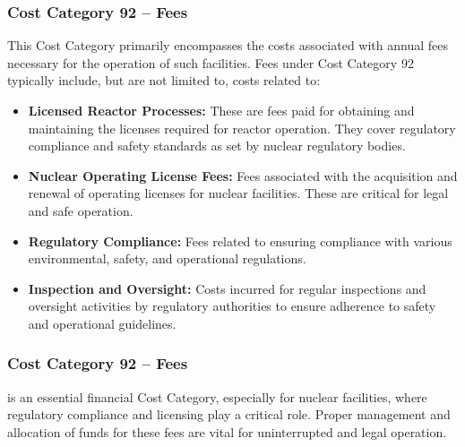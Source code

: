 \subsubsection*{Cost Category 92 – Fees}
This Cost Category primarily encompasses the costs associated with annual fees necessary for the operation of such facilities.  Fees under Cost Category 92 typically include, but are not limited to, costs related to:

\begin{itemize}
    \item \textbf{Licensed Reactor Processes:} These are fees paid for obtaining and maintaining the licenses required for reactor operation. They cover regulatory compliance and safety standards as set by nuclear regulatory bodies.
    \item \textbf{Nuclear Operating License Fees:} Fees associated with the acquisition and renewal of operating licenses for nuclear facilities. These are critical for legal and safe operation.
    \item \textbf{Regulatory Compliance:} Fees related to ensuring compliance with various environmental, safety, and operational regulations.
    \item \textbf{Inspection and Oversight:} Costs incurred for regular inspections and oversight activities by regulatory authorities to ensure adherence to safety and operational guidelines.
\end{itemize}

\subsubsection{Cost Category 92 – Fees} is an essential financial Cost Category, especially for nuclear facilities, where regulatory compliance and licensing play a critical role. Proper management and allocation of funds for these fees are vital for uninterrupted and legal operation.

